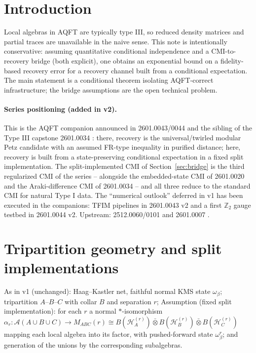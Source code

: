 \documentclass[11pt]{article}
\theoremstyle{remark}
\begin{document}
\section{Introduction}
Local algebras in AQFT are typically type III, so reduced density
matrices and partial traces are unavailable in the naive sense. This note
is intentionally conservative: assuming quantitative conditional
independence and a CMI-to-recovery bridge (both explicit), one obtains an
exponential bound on a fidelity-based recovery error for a recovery
channel built from a conditional expectation. The main statement is a
conditional theorem isolating AQFT-correct infrastructure; the bridge
assumptions are the open technical problem.

\paragraph{Series positioning (added in v2).} This is the AQFT companion
announced in 2601.0043/0044 \cite{S0043, S0044} and the sibling of the
Type III capstone 2601.0034 \cite{S0034}: there, recovery is the
universal/twirled modular Petz candidate with an assumed FR-type
inequality in purified distance; here, recovery is built from a
state-preserving conditional expectation in a fixed split implementation.
The split-implemented CMI of Section~\ref{sec:bridge} is the third
regularized CMI of the series -- alongside the embedded-state CMI of
2601.0020 \cite{S0020} and the Araki-difference CMI of 2601.0034 -- and
all three reduce to the standard CMI for natural Type I data. The
``numerical outlook'' deferred in v1 has been executed in the companions:
TFIM pipelines in 2601.0043 v2 and a first $\mathbb{Z}_2$ gauge testbed
in 2601.0044 v2. Upstream: 2512.0060/0101 and 2601.0007
\cite{S0060, S0101, S0007}.

\section{Tripartition geometry and split implementations}
As in v1 (unchanged): Haag--Kastler net, faithful normal KMS state
$\omega_\beta$; tripartition $A$--$B$--$C$ with collar $B$ and separation
$r$; Assumption (fixed split implementation): for each $r$ a normal
$*$-isomorphism $\alpha_r : \mathcal{A}(A\cup B\cup C) \to M_{ABC}(r)
\cong B(\mathcal{H}_A^{(r)}) \bar\otimes B(\mathcal{H}_B^{(r)})
\bar\otimes B(\mathcal{H}_C^{(r)})$ mapping each local algebra into its
factor, with pushed-forward state $\omega^r_\beta$; and generation of the
unions by the corresponding subalgebras.
\end{document}
